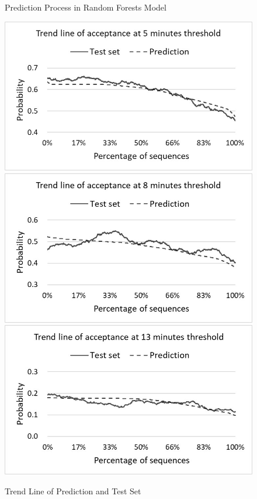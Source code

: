 \documentclass[Journal,letterpaper]{ascelike-new}
\begin{document}
%
\begin{figure}[htp]
    \caption{Prediction Process in Random Forests Model}
    \label{fig:6}
    \centering
\end{figure}

%
\begin{figure}[htp]
    \caption{Trend Line of Prediction and Test Set}
    \label{fig:7}
    \centering
    \includegraphics[width=0.7\linewidth]{fig7-1}\\
    \includegraphics[width=0.7\linewidth]{fig7-2}\\
    \includegraphics[width=0.7\linewidth]{fig7-3}\\
\end{figure}

\pagebreak

%


%
\end{document}
